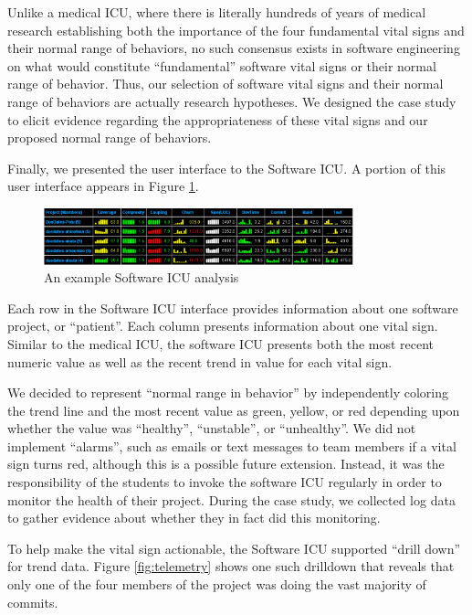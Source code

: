\documentclass{acm_proc_article-sp}
\begin{document}
Unlike a medical ICU, where there is literally hundreds of years of medical
research establishing both the importance of the four fundamental vital
signs and their normal range of behaviors, no such consensus exists in
software engineering on what would constitute ``fundamental'' software
vital signs or their normal range of behavior.  Thus, our selection of
software vital signs and their normal range of behaviors are actually
research hypotheses.  We designed the case study to elicit evidence
regarding the appropriateness of these vital signs and our proposed normal
range of behaviors.

Finally, we presented the user interface to the Software ICU. A portion of
this user interface appears in Figure \ref{fig:sicu}.

\begin{figure}[ht]
  \center
  \includegraphics[width=0.8\textwidth]{portfolio-2008.eps}
  \caption{An example Software ICU analysis}
  \label{fig:sicu}
\end{figure} 

Each row in the Software ICU interface provides information about one
software project, or ``patient''.  Each column presents information about
one vital sign. Similar to the medical ICU, the software ICU presents both
the most recent numeric value as well as the recent trend in value for each
vital sign.

We decided to represent ``normal range in behavior'' by independently
coloring the trend line and the most recent value as green, yellow, or red
depending upon whether the value was ``healthy'', ``unstable'', or
``unhealthy''.  We did not implement ``alarms'', such as emails or text
messages to team members if a vital sign turns red, although this is a
possible future extension.  Instead, it was the responsibility of the
students to invoke the software ICU regularly in order to monitor the
health of their project.  During the case study, we collected log data to
gather evidence about whether they in fact did this monitoring.

To help make the vital sign actionable, the Software ICU supported ``drill
down'' for trend data.  Figure \ref{fig:telemetry} shows one such drilldown
that reveals that only one of the four members of the project was doing the
vast majority of commits.
\end{document}
